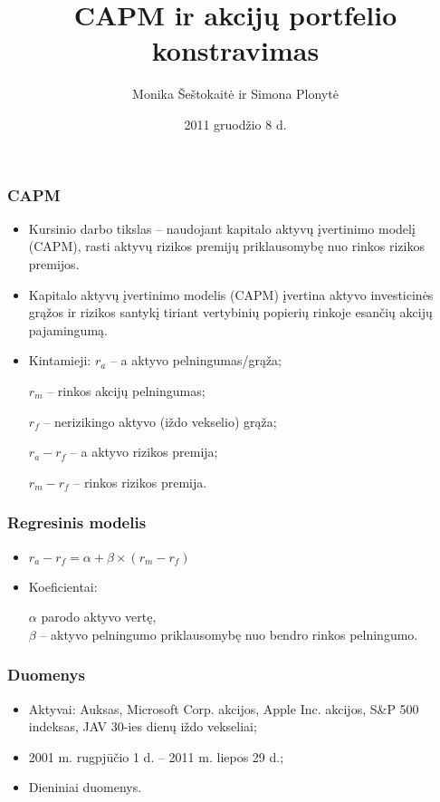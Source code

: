 \documentclass[utf8,hyperref={unicode},xcolor=dvipsnames]{beamer}
\title[CAPM]{CAPM ir akcijų portfelio konstravimas}
\author[ ]{Monika Šeštokaitė ir Simona Plonytė}
\institute[Vilnius University] {
    
    Vilniaus Universitetas
    \and
    
   Matematikos ir informatikos fakultetas
\and
Ekonometrinės analizės katedra
 }
\date{2011 gruodžio 8 d.}
\theoremstyle{change}\newtheorem{teorema}{Teiginys}
\theoremstyle{change}\newtheorem{salyga}{}
\begin{document}
\begin{frame}
    \titlepage
\end{frame}

\begin{frame}
    \frametitle{CAPM} 
    \begin{itemize}
\item Kursinio darbo tikslas -- naudojant kapitalo aktyvų įvertinimo modelį (CAPM), rasti aktyvų rizikos premijų priklausomybę nuo rinkos rizikos premijos.
	\item Kapitalo aktyvų įvertinimo modelis (CAPM) įvertina aktyvo investicinės grąžos ir rizikos santykį tiriant vertybinių popierių rinkoje esančių akcijų pajamingumą.
    \item Kintamieji: $r_a$ -- a aktyvo pelningumas/grąža; 

$r_m$ -- rinkos akcijų pelningumas; 

$r_f$ -- nerizikingo aktyvo (iždo vekselio) grąža; 

$r_a-r_f$ -- a aktyvo rizikos premija; 

$r_m - r_f$ -- rinkos rizikos premija.
    \end{itemize}
\end{frame}
\begin{frame}
    \frametitle{Regresinis modelis} 
    \begin{itemize}
	\item $r_a - r_f = \alpha + \beta \times (r_m - r_f)$
	\item Koeficientai: 

$ \alpha $ parodo aktyvo vertę,\\ 

$ \beta $ -- aktyvo pelningumo priklausomybę nuo bendro rinkos pelningumo.
	

	



    \end{itemize}
\end{frame}
\begin{frame}
    \frametitle{Duomenys} 
    \begin{itemize}
 	\item Aktyvai: Auksas, Microsoft Corp. akcijos, Apple Inc. akcijos, S\&P 500 indeksas, JAV 30-ies dienų iždo vekseliai;
	\item 2001 m. rugpjūčio 1 d. -- 2011 m. liepos 29 d.;
	\item Dieniniai duomenys.

    \end{itemize}
\end{frame}
\end{document}
